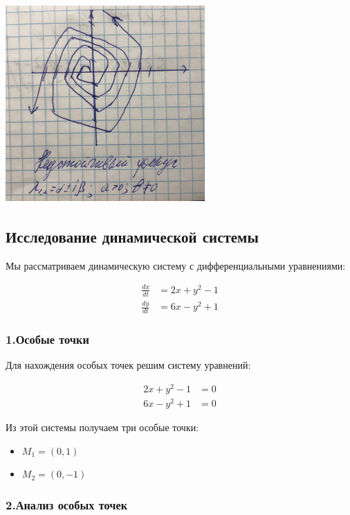 \documentclass[12pt]{article}
\begin{document}
\begin{center}
\includegraphics[width=3in,height=3in]{phase_trajectories.jpeg}
\end{center}

\subsection{Исследование динамической системы}

Мы рассматриваем динамическую систему с дифференциальными уравнениями:

\[
\begin{aligned}
\frac{{dx}}{{dt}} &= 2x+y^2-1 \\
\frac{{dy}}{{dt}} &= 6x-y^2+1
\end{aligned}
\]

\subsubsection{1.Особые точки}

Для нахождения особых точек решим систему уравнений:

\[
\begin{aligned}
2x+y^2-1 &= 0 \\
 6x-y^2+1 &= 0
\end{aligned}
\]

Из этой системы получаем три особые точки:

\begin{itemize}
  \item $M_1 = (0, 1)$
  \item $M_2 = (0, -1)$
\end{itemize}

\subsubsection{2.Анализ особых точек}
\end{document}
